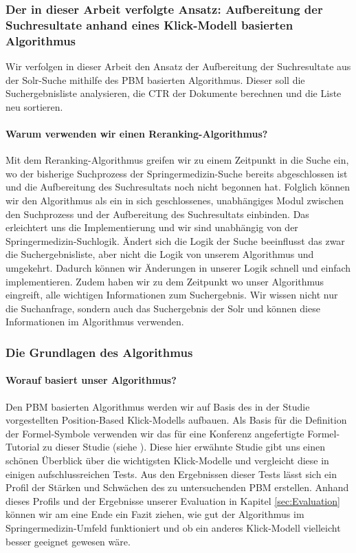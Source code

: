 \subsubsection{Der in dieser Arbeit verfolgte Ansatz: Aufbereitung der Suchresultate anhand eines Klick-Modell basierten Algorithmus}
\label{sec:Grundlagen:Grundbegriffe:Result-RerankingPBM:AnsatzSucheEinbinden}

Wir verfolgen in dieser Arbeit den Ansatz der Aufbereitung der Suchresultate aus der Solr-Suche mithilfe des PBM basierten Algorithmus. Dieser soll die Suchergebnisliste analysieren, die CTR der Dokumente berechnen und die Liste neu sortieren. 

\paragraph{Warum verwenden wir einen Reranking-Algorithmus?}
Mit dem Reranking-Algorithmus greifen wir zu einem Zeitpunkt in die Suche ein, wo der bisherige Suchprozess der Springermedizin-Suche bereits abgeschlossen ist und die Aufbereitung des Suchresultats noch nicht begonnen hat. Folglich können wir den Algorithmus als ein in sich geschlossenes, unabhängiges Modul zwischen den Suchprozess und der Aufbereitung des Suchresultats einbinden. Das erleichtert uns die Implementierung und wir sind unabhängig von der Springermedizin-Suchlogik. Ändert sich die Logik der Suche beeinflusst das zwar die Suchergebnisliste, aber nicht die Logik von unserem Algorithmus und umgekehrt. Dadurch können wir Änderungen in unserer Logik schnell und einfach implementieren. Zudem haben wir zu dem Zeitpunkt wo unser Algorithmus eingreift, alle wichtigen Informationen zum Suchergebnis. Wir wissen nicht nur die Suchanfrage, sondern auch das Suchergebnis der Solr und können diese Informationen im Algorithmus verwenden.

\subsubsection{Die Grundlagen des Algorithmus}
\label{sec:Grundlagen:Grundbegriffe:Result-RerankingPBM:Grundlagen}

\paragraph{Worauf basiert unser Algorithmus?}
Den PBM basierten Algorithmus werden wir auf Basis des in der Studie \cite{pbm} vorgestellten Position-Based Klick-Modells aufbauen. Als Basis für die Definition der Formel-Symbole verwenden wir das für eine Konferenz angefertigte Formel-Tutorial zu dieser Studie (siehe \cite{pbmTutorial}). Diese hier erwähnte Studie gibt uns einen schönen Überblick über die wichtigsten Klick-Modelle und vergleicht diese in einigen aufschlussreichen Tests. Aus den Ergebnissen dieser Tests lässt sich ein Profil der Stärken und Schwächen des zu untersuchenden PBM erstellen. Anhand dieses Profils und der Ergebnisse unserer Evaluation in Kapitel \ref{sec:Evaluation} können wir am eine Ende ein Fazit ziehen, wie gut der Algorithmus im Springermedizin-Umfeld funktioniert und ob ein anderes Klick-Modell vielleicht besser geeignet gewesen wäre.

